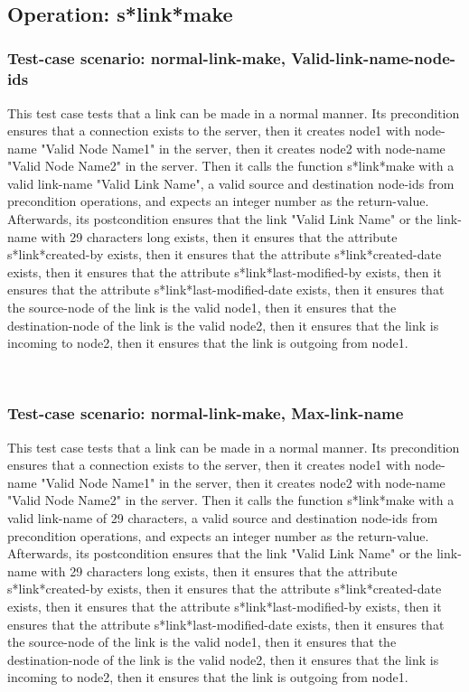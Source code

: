 \
\subsection {Operation: s*link*make}
\subsubsection {Test-case scenario: normal-link-make, Valid-link-name-node-ids}


This test case tests that a link can be made in a normal manner.
Its precondition ensures that a connection exists to the server, then it creates node1 with node-name "Valid Node Name1" in the server, then it creates node2 with node-name  "Valid Node Name2" in the server.
Then it calls the function s*link*make  with a valid link-name "Valid Link Name", a valid source and destination node-ids from precondition operations, and expects an integer number as the return-value.
Afterwards, its postcondition ensures that the link "Valid Link Name" or the link-name with 29 characters long exists, then it ensures that the attribute s*link*created-by exists, then it ensures that the attribute s*link*created-date exists, then it ensures that the attribute s*link*last-modified-by exists, then it ensures that the attribute s*link*last-modified-date exists, then it ensures that the source-node of the link is the valid node1, then it ensures that the destination-node of the link is the valid node2, then it ensures that the link is incoming to node2, then it ensures that the link is outgoing from node1.




\
\subsubsection {Test-case scenario: normal-link-make, Max-link-name}


This test case tests that a link can be made in a normal manner.
Its precondition ensures that a connection exists to the server, then it creates node1 with node-name "Valid Node Name1" in the server, then it creates node2 with node-name  "Valid Node Name2" in the server.
Then it calls the function s*link*make  with a valid link-name of 29 characters, a valid source and destination node-ids from precondition operations, and expects an integer number as the return-value.
Afterwards, its postcondition ensures that the link "Valid Link Name" or the link-name with 29 characters long exists, then it ensures that the attribute s*link*created-by exists, then it ensures that the attribute s*link*created-date exists, then it ensures that the attribute s*link*last-modified-by exists, then it ensures that the attribute s*link*last-modified-date exists, then it ensures that the source-node of the link is the valid node1, then it ensures that the destination-node of the link is the valid node2, then it ensures that the link is incoming to node2, then it ensures that the link is outgoing from node1.




